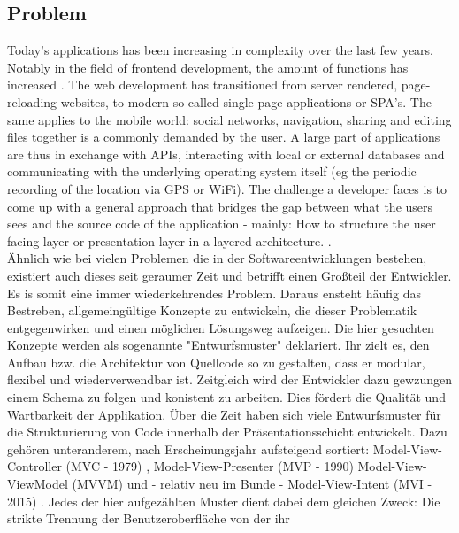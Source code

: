 \subsection{Problem}
\label{subsec:problem}

Today's applications has been increasing in complexity over the last few years.
Notably in the field of frontend development, the amount of functions has increased \cite{kevin2018}. The web development has transitioned from server rendered, 
page-reloading websites, to modern so called single page applications or SPA's.
The same applies to the mobile world: social networks, navigation, sharing and editing files together is a commonly demanded by the user.
A large part of applications are thus in exchange with APIs, interacting with local or external databases
and communicating with the underlying operating system itself (eg the periodic recording of the location via GPS or WiFi).
The challenge a developer faces is to come up with a general approach that bridges the gap between what the users sees and the source code of 
the application - mainly: How to structure the user facing layer or presentation layer in a layered architecture. \cite{guru99ntier,softwareArchitecturePatternsMark2015}. \\
Ähnlich wie bei vielen Problemen die in der Softwareentwicklungen bestehen, existiert auch dieses seit geraumer Zeit und betrifft einen Großteil der Entwickler. 
Es is somit eine immer wiederkehrendes Problem. Daraus ensteht häufig das Bestreben, allgemeingültige Konzepte zu entwickeln, die dieser Problematik entgegenwirken 
und einen möglichen Lösungsweg aufzeigen. Die hier gesuchten Konzepte werden als sogenannte "Entwurfsmuster" \cite{techterms2016design-pattern} deklariert. Ihr zielt es, den Aufbau bzw. 
die Architektur von Quellcode so zu gestalten, dass er modular, flexibel und
wiederverwendbar ist. Zeitgleich wird der Entwickler dazu gewzungen einem Schema zu folgen und konistent zu arbeiten. Dies fördert die Qualität und
Wartbarkeit der Applikation. Über die Zeit haben sich viele Entwurfsmuster für die Strukturierung von Code innerhalb der Präsentationsschicht entwickelt. 
Dazu gehören unteranderem, nach Erscheinungsjahr aufsteigend sortiert: Model-View-Controller (MVC - 1979) \cite{wikipediaMvc}, 
Model-View-Presenter (MVP - 1990) \cite{wikipediaMvp} Model-View-ViewModel (MVVM) \cite{blogMsdnMvvm} und - relativ 
neu im Bunde - Model-View-Intent (MVI - 2015) \cite{youtubeAndreStaltzUserFunction}. Jedes der hier aufgezählten Muster dient dabei dem gleichen Zweck: Die strikte Trennung der Benutzeroberfläche von der ihr 
